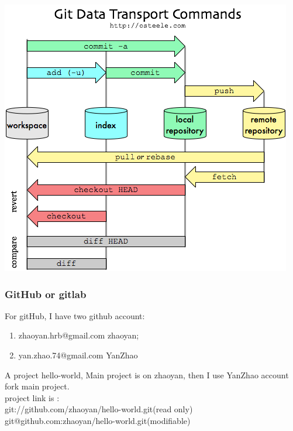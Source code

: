 \documentclass[a4paper,12pt,twoside]{book}
\begin{document}
 \includegraphics[scale=0.8]{pics/git-transport} \\

\subsubsection{GitHub or gitlab}
For gitHub, I have two github account:
\begin{enumerate}
  \item zhaoyan.hrb@gmail.com  zhaoyan;
  \item yan.zhao.74@gmail.com YanZhao
\end{enumerate}
A project hello-world, Main project is on zhaoyan, then I use YanZhao account fork main project. \\
project link is : \\
git://github.com/zhaoyan/hello-world.git(read only) \\
git@github.com:zhaoyan/hello-world.git(modifiable)
\end{document}

